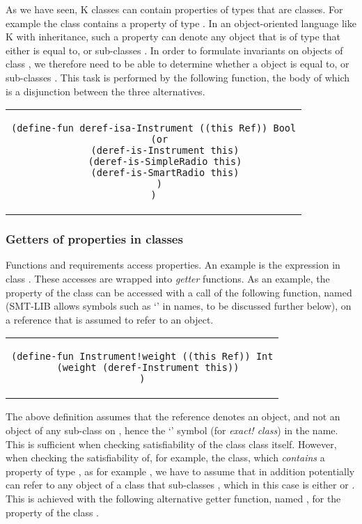 As we have seen, K classes can contain properties of types that are
classes. For example the  class contains a property
 of type . In an object-oriented language
like K with inheritance, such a property can denote any object that is
of type that either is equal to, or sub-classes . In
order to formulate invariants on objects of class ,
we therefore need to be able to determine whether a  object is equal
to, or sub-classes . This task is performed by the
following function, the body of which is a disjunction between the
three alternatives.

\begin{center}
\begin{tabular}{c}
\begin{lstlisting}
(define-fun deref-isa-Instrument ((this Ref)) Bool
  (or
    (deref-is-Instrument this)
    (deref-is-SimpleRadio this)
    (deref-is-SmartRadio this)
  )
)
\end{lstlisting}
\end{tabular}
\end{center}

\subsubsection{Getters of properties in classes}

Functions and requirements access properties. An example is the
expression  in class .  These
accesses are wrapped into {\em getter} functions. As an example, the
 property of the class  can be accessed
with a call of the following function, named 
(SMT-LIB allows symbols such as `\code{!}'  in names, to be discussed
further below), on a reference that is assumed to refer to an
 object.

\begin{center}
\begin{tabular}{c}
\begin{lstlisting}
(define-fun Instrument!weight ((this Ref)) Int
  (weight (deref-Instrument this))
)
\end{lstlisting}
\end{tabular}
\end{center}

The above definition assumes that the  reference denotes an
 object, and not an object of any sub-class on
, hence the `\code{!}' symbol (for {\em exact!
  class}) in the name.  This is sufficient when checking
satisfiability of the class  class itself. However,
when checking the satisfiability of, for example, the 
class, which {\em contains} a property of type , as
for example , we have to assume that
 in addition potentially can refer to any object of a
class that sub-classes , which in this case is either
 or . This is achieved with the
following alternative getter function, named ,
for the  property of the class .


